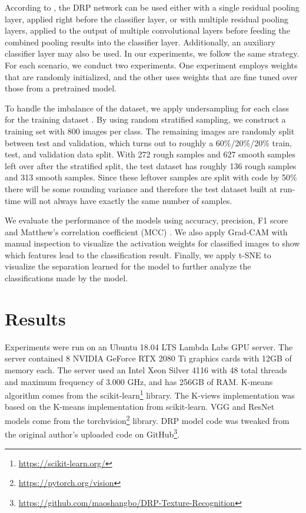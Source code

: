 \documentclass{aci}
\numberwithin{equation}{section}
\begin{document}
According to \cite{mao_deep_2021}, the DRP network can be used either with a
single residual pooling layer, applied right before the classifier layer, or
with multiple residual pooling layers, applied to the output of multiple
convolutional layers before feeding the combined pooling results into the
classifier layer. Additionally, an auxiliary classifier layer may also be used.
In our experiments, we follow the same strategy. For each scenario, we conduct
two experiments. One experiment employs weights that are randomly initialized,
and the other uses weights that are fine tuned over those from a pretrained
model.

To handle the imbalance of the dataset, we apply undersampling for each class
for the training dataset \cite{tiittanen_novel_2022}. By using random stratified
sampling, we construct a training set with 800 images per class. The remaining
images are randomly split between test and validation, which turns out to
roughly a 60\%/20\%/20\% train, test, and validation data split. With 272 rough
samples and 627 smooth samples left over after the stratified split, the test
dataset has roughly 136 rough samples and 313 smooth samples. Since these
leftover samples are split with code by 50\% there will be some rounding
variance and therefore the test dataset built at run-time will not always have
exactly the same number of samples.


We evaluate the performance of the models using accuracy, precision, F1 score
and Matthew's correlation coefficient (MCC) \cite{chicco_matthews_2021}. We also
apply Grad-CAM with manual inspection to visualize the activation weights for
classified images to show which features lead to the classification result.
Finally, we apply t-SNE to visualize the separation learned for the model to
further analyze the classifications made by the model.

\section{Results}


Experiments were run on an Ubuntu 18.04 LTS Lambda Labs GPU server. The server
contained 8 NVIDIA GeForce RTX 2080 Ti graphics cards with 12GB of memory each.
The server used an Intel Xeon Silver 4116 with 48 total threads and maximum
frequency of 3.000 GHz, and has 256GB of RAM. K-means algorithm comes from the
scikit-learn\footnote{\url{https://scikit-learn.org/}} library. The K-views
implementation was based on the K-means implementation from scikit-learn. VGG
and ResNet models come from the
torchvision\footnote{\url{https://pytorch.org/vision}} library. DRP model code
was tweaked from the original author's uploaded code on
GitHub\footnote{\url{https://github.com/maoshangbo/DRP-Texture-Recognition}}.
\end{document}
